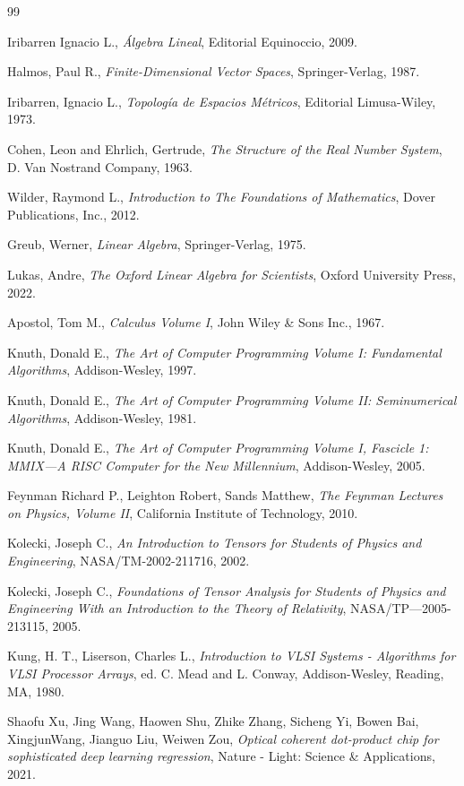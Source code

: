 \documentclass[12pt,openany]{book}
\theoremstyle{definition}
\begin{document}
\begin{thebibliography}{99}

Iribarren Ignacio L., \textit{Álgebra Lineal}, Editorial Equinoccio, 2009.

Halmos, Paul R., \textit{Finite-Dimensional Vector Spaces}, Springer-Verlag, 1987.

Iribarren, Ignacio L., \textit{Topología de Espacios Métricos}, Editorial Limusa-Wiley, 1973.

Cohen, Leon and Ehrlich, Gertrude, \textit{The Structure of the Real Number System}, D. Van Nostrand Company, 1963.

Wilder, Raymond L., \textit{Introduction to The Foundations of Mathematics}, Dover Publications, Inc., 2012.

Greub, Werner, \textit{Linear Algebra}, Springer-Verlag, 1975.

Lukas, Andre, \textit{The Oxford Linear Algebra for Scientists}, Oxford University Press, 2022.

Apostol, Tom M., \textit{Calculus Volume I}, John Wiley \& Sons Inc., 1967.

Knuth, Donald E., \textit{The Art of Computer Programming Volume I: Fundamental Algorithms}, Addison-Wesley, 1997.

Knuth, Donald E., \textit{The Art of Computer Programming Volume II: Seminumerical Algorithms}, Addison-Wesley, 1981.

Knuth, Donald E., \textit{The Art of Computer Programming Volume I, Fascicle 1: MMIX—A RISC Computer for the New Millennium}, Addison-Wesley, 2005.

Feynman Richard P., Leighton Robert, Sands Matthew, \textit{The Feynman Lectures on Physics, Volume II}, California Institute of Technology, 2010.

Kolecki, Joseph C., \textit{An Introduction to Tensors for Students of Physics and Engineering}, NASA/TM-2002-211716, 2002.

Kolecki, Joseph C., \textit{Foundations of Tensor Analysis for Students of Physics and Engineering With an Introduction
to the Theory of Relativity}, NASA/TP—2005-213115, 2005.

Kung, H. T., Liserson, Charles L., \textit{Introduction to VLSI Systems - Algorithms for VLSI Processor Arrays}, ed. C. Mead and L. Conway, Addison-Wesley, Reading, MA, 1980.

Shaofu Xu, Jing Wang, Haowen Shu, Zhike Zhang, Sicheng Yi, Bowen Bai, XingjunWang, Jianguo Liu, Weiwen Zou, \textit{Optical coherent dot-product chip for sophisticated deep learning regression}, Nature - Light: Science \& Applications, 2021.

\end{thebibliography}
\end{document}
